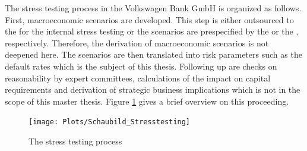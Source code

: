 \documentclass[a4paper, 11pt]{scrreprt}
\begin{document}
The stress testing process in the Volkswagen Bank GmbH is organized as follows. First, macroeconomic scenarios are developed. This step is either outsourced to the \textcite{iwh2017scenario} for the internal stress testing or the scenarios are prespecified by the \textcite{eba2018stresstest} or the \textcite{ecb2018srep}, respectively. Therefore, the derivation of macroeconomic scenarios is not deepened here. 
The scenarios are then translated into risk parameters such as the default rates which is the subject of this thesis. Following up are checks on reasonability by expert committees, calculations of the impact on capital requirements and derivation of strategic business implications which is not in the scope of this master thesis. Figure \ref{image:stresstesting} gives a brief overview on this proceeding.

\begin{figure}[H]
	\centering
	\texttt{[image: Plots/Schaubild\_Stresstesting]}
	\caption{The stress testing process}
	\label{image:stresstesting}
\end{figure}
\end{document}
